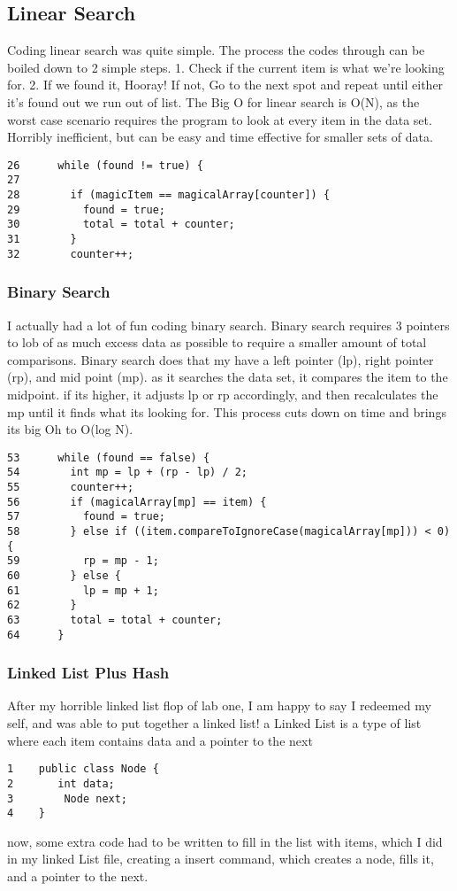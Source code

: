 \documentclass{article}
\begin{document}
\subsection{Linear Search}
Coding linear search was quite simple. The process the codes through can be boiled down to 2 simple steps. 1. Check if the current item is what we're looking for. 2. If we found it, Hooray! If not, Go to the next spot and repeat until either it's found out we run out of list. The Big O for linear search is O(N), as the worst case scenario requires the program to look at every item in the data set. Horribly inefficient, but can be easy and time effective for smaller sets of data.
\begin{verbatim}
26      while (found != true) {
27
28        if (magicItem == magicalArray[counter]) {
29          found = true;
30          total = total + counter;
31        }
32        counter++;
\end{verbatim}



\subsubsection{Binary Search }
I actually had a lot of fun coding binary search. Binary search requires 3 pointers to lob of as much excess data as possible to require a smaller amount of total comparisons. Binary search does that my have a left pointer (lp), right pointer (rp), and mid point (mp). as it searches the data set, it compares the item to the midpoint. if its higher, it adjusts lp or rp accordingly, and then recalculates the mp until it finds what its looking for. This process cuts down on time and brings its big Oh to O(log N).
\begin{verbatim}
53      while (found == false) {
54        int mp = lp + (rp - lp) / 2;
55        counter++;
56        if (magicalArray[mp] == item) {
57          found = true;
58        } else if ((item.compareToIgnoreCase(magicalArray[mp])) < 0) {
59          rp = mp - 1;
60        } else {
61          lp = mp + 1;
62        }
63        total = total + counter;
64      }
\end{verbatim}


\subsubsection{Linked List Plus Hash}
After my horrible linked list flop of lab one, I am happy to say I redeemed my self, and was able to put together a linked list! a Linked List is a type of list where each item contains data and a pointer to the next
\begin{verbatim}
1    public class Node {
2       int data;
3        Node next;
4    }
\end{verbatim}
now, some extra code had to be written to fill in the list with items, which I did in my linked List file, creating a insert command, which creates a node, fills it, and a pointer to the next.
\end{document}
